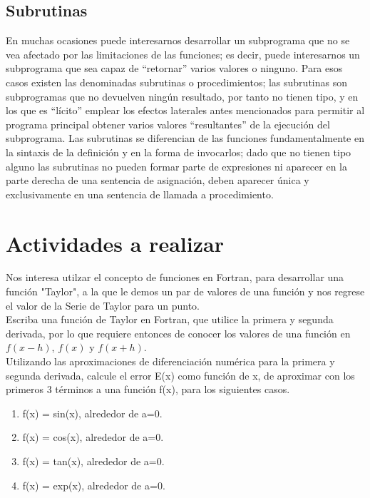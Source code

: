 \documentclass[12pt,a4paper,openright]{article}
\begin{document}
\subsection*{Subrutinas}

En muchas ocasiones puede interesarnos desarrollar un subprograma que no se vea afectado por las
limitaciones de las funciones; es decir, puede interesarnos un subprograma que sea capaz de “retornar” varios valores o
ninguno. Para esos casos existen las denominadas subrutinas o procedimientos; las subrutinas son subprogramas que
no devuelven ningún resultado, por tanto no tienen tipo, y en los que es “lícito” emplear los efectos laterales antes
mencionados para permitir al programa principal obtener varios valores “resultantes” de la ejecución del subprograma.
Las subrutinas se diferencian de las funciones fundamentalmente en la sintaxis de la definición y en la forma de
invocarlos; dado que no tienen tipo alguno las subrutinas no pueden formar parte de expresiones ni aparecer en la parte
derecha de una sentencia de asignación, deben aparecer única y exclusivamente en una sentencia de llamada a
procedimiento.




\section*{Actividades a realizar}


Nos interesa utilzar el concepto de funciones en Fortran, para desarrollar una función "Taylor", a la que le demos un par de valores de una función y nos regrese el valor de la Serie de Taylor para un punto.\\

Escriba una función de Taylor en Fortran, que utilice la primera y segunda derivada, por lo que requiere entonces de conocer los valores de una función en $f(x-h)$, $f(x)$  y $f(x+h)$. \\

Utilizando las aproximaciones de diferenciación numérica para la primera y segunda derivada, calcule el error E(x) como función de x, de aproximar con los primeros 3 términos a una función f(x), para los siguientes casos. \\

\begin{enumerate}

\item f(x) = sin(x), alrededor de a=0.
\item f(x) = cos(x), alrededor de a=0.
\item f(x) = tan(x), alrededor de a=0.
\item f(x) = exp(x), alrededor de a=0.

\end{enumerate}
 
\end{document}
